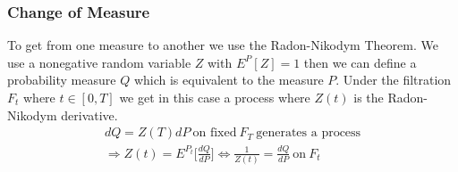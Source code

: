 \documentclass[11pt]{article}
\numberwithin{equation}{subsection}
\begin{document}
\subsubsection{Change of Measure}
To get from one measure to another we use the Radon-Nikodym Theorem. We use a nonegative random variable \(Z\) with \(E^{P}[Z]=1\) then we can define a probability measure \(Q\) which is equivalent to the measure \(P\). Under the filtration \(F_t\) where \(t \in [0, T]\) we get in this case a process where \(Z(t)\) is the Radon-Nikodym derivative.
\begin{eqnarray}
dQ = Z(T)dP \ \text{on fixed} \  F_T \ \text{generates a process}\\
\Rightarrow Z(t) = E^{P_t}\Big[\frac{dQ}{dP}\Big] \iff \frac{1}{Z(t)} = \frac{dQ}{dP} \ \text{on} \ F_t
\end{eqnarray}
\end{document}
